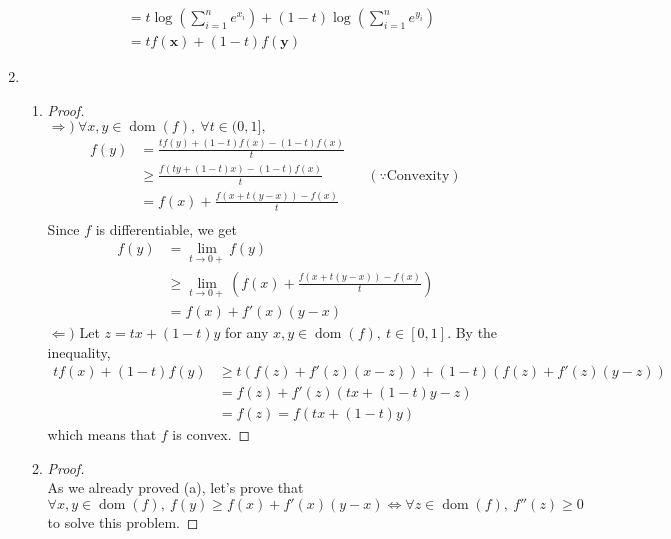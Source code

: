 \documentclass[11pt]{article}
\begin{document}
\begin{enumerate}
\begin{enumerate}
\begin{align*}
    &= t\log\left(\sum_{i=1}^{n}e^{x_{i}}\right)+(1-t)\log\left(\sum_{i=1}^{n}e^{y_{i}}\right) \\
    &= tf(\bm x)+(1-t)f(\bm y)
    \end{align*}
\end{enumerate}
\item
\begin{enumerate}
    \item
    \begin{proof}$ $\\
    $\Rightarrow)\ \forall x,y\in\operatorname{dom}(f),\ \forall t\in(0,1],$
    \begin{align*}
    f(y) &= \frac{tf(y)+(1-t)f(x)-(1-t)f(x)}{t} \\
    &\ge \frac{f(ty+(1-t)x)-(1-t)f(x)}{t} && (\because \text{Convexity}) \\
    &= f(x)+\frac{f(x+t(y-x))-f(x)}{t} \\
    \end{align*}
    Since $f$ is differentiable, we get
    \begin{align*}
    f(y) &= \lim_{t\to 0+}f(y) \\
    &\ge \lim_{t\to 0+}\left(f(x)+\frac{f(x+t(y-x))-f(x)}{t}\right) \\
    &= f(x)+f'(x)(y-x)
    \end{align*}
    $\Leftarrow)$ Let $z=tx+(1-t)y$ for any $x,y\in\operatorname{dom}(f),\ t\in[0,1]$. By the inequality,
    \begin{align*}
    tf(x)+(1-t)f(y) &\ge t(f(z)+f'(z)(x-z))+(1-t)(f(z)+f'(z)(y-z)) \\
    &= f(z)+f'(z)(tx+(1-t)y-z) \\
    &= f(z) = f(tx+(1-t)y)
    \end{align*}
    which means that $f$ is convex.
    \end{proof}
    \item
    \begin{proof}$ $\\
    As we already proved (a), let's prove that $\forall x,y\in\operatorname{dom}(f),\ f(y)\ge f(x)+f'(x)(y-x)\Longleftrightarrow \forall z\in\operatorname{dom}(f),\ f''(z)\ge 0$ to solve this problem.
    

\end{proof}
\end{enumerate}
\end{enumerate}
\end{document}
